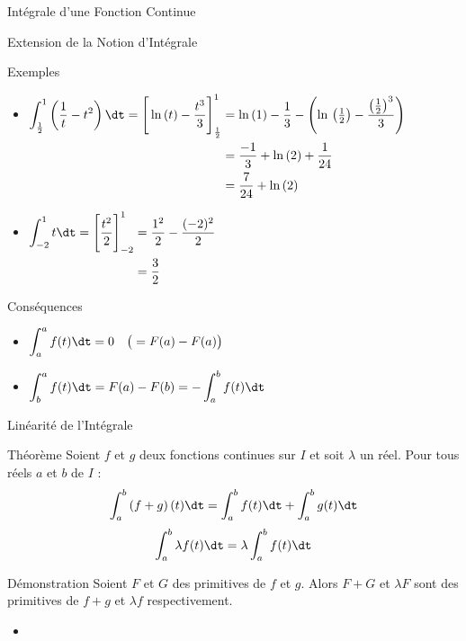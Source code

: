 \documentclass{cours}
\begin{document}
\begin{Gpartie}{Intégrale d'une Fonction Continue}
\begin{Spartie}{Extension de la Notion d'Intégrale}
\begin{SSpartie}{Exemples}
\begin{itemize}
                    \item 
                    $\begin{aligned}[t]
                        \int_\frac{1}{2}^1\left(\frac{1}{t}-t^2\right)\dt=\Bigg[\ln\,(t)-\frac{t^3}{3}\Bigg]_\frac{1}{2}^1&=\ln\,(1)-\frac{1}{3}-\left(\ln\,\left(\tfrac{1}{2}\right)-\frac{\left(\frac{1}{2}\right)^3}{3}\right) \\
                        &=\frac{-1}{3}+\ln\,(2)+\frac{1}{24} \\
                        &=\frac{7}{24}+\ln\,(2)
                    \end{aligned}$
                    \item 
                    $\begin{aligned}[t]
                        \int_{-2}^1t\dt=\Bigg[\frac{t^2}{2}\Bigg]_{-2}^1&=\frac{1^2}{2}-\frac{(-2)^2}{2} \\
                        &=\frac{3}{2}
                    \end{aligned}$
                \end{itemize}
            \end{SSpartie}
            \pagebreak
            \begin{SSpartie}{Conséquences} 
                \begin{itemize}
                    \item $\displaystyle\int_a^af(t)\dt=0\quad\big(=F(a)-F(a)\big)$
                    \item $\displaystyle\int_b^af(t)\dt=F(a)-F(b)=-\int_a^b f(t)\dt$
                \end{itemize}
            \end{SSpartie}
        \end{Spartie}
        \begin{Spartie}{Linéarité de l'Intégrale} 
            \begin{SSpartie}{Théorème} 
                Soient $f$ et $g$ deux fonctions continues sur $I$ et soit $\lambda$ un réel. Pour tous réels $a$ et $b$ de $I$ : \[\int_a^b\left(f+g\right)(t)\dt=\int_a^b f(t)\dt+\int_a^bg(t)\dt\] \[\int_a^b\lambda f(t)\dt=\lambda\int_a^b f(t)\dt\]
                \begin{SSSpartie}{Démonstration} 
                    Soient $F$ et $G$ des primitives de $f$ et $g$. Alors $F+G$ et $\lambda F$ sont des primitives de $f+g$ et $\lambda f$ respectivement.
                    \begin{itemize}
                        \item 

\end{itemize}
\end{SSSpartie}
\end{SSpartie}
\end{Spartie}
\end{Gpartie}
\end{document}
